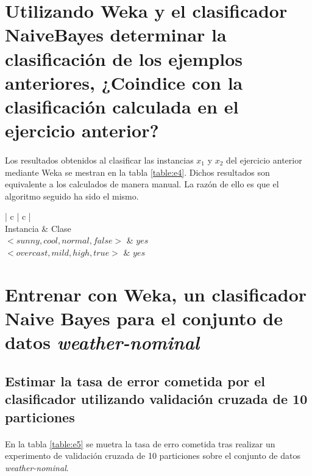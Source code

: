 \documentclass{article}
\begin{document}
	\section{Utilizando Weka y el clasificador NaiveBayes determinar la clasificación de los ejemplos anteriores, ¿Coindice con la clasificación calculada en el ejercicio anterior?}
	\label{sec:e4}

		\paragraph{}
		Los resultados obtenidos al clasificar las instancias $x_1$ y $x_2$ del ejercicio anterior mediante Weka se mestran en la tabla \ref{table:e4}. Dichos resultados son equivalente a los calculados de manera manual. La razón de ello es que el algoritmo seguido ha sido el mismo.

		\begin{table}[H]
			\centering
			\begin{tabu}{ | c | c | }
				\hline
				 \\ \hline
				Instancia	& Clase \\ \hline
				$<sunny, cool, normal, false>$	& $yes$	\\ \hline
				$<overcast, mild, high, true>$	& $yes$	\\
				\hline
			\end{tabu}
			\caption{Clasificación obtenida mediante WEKA}
			\label{table:e4}
		\end{table}

	\section{Entrenar con Weka, un clasificador Naive Bayes para el conjunto de datos \emph{weather-nominal}}
	\label{sec:e5}

		\subsection{Estimar la tasa de error cometida por el clasificador utilizando validación cruzada de 10 particiones}

			\paragraph{}
			En la tabla \ref{table:e5} se muetra la tasa de erro cometida tras realizar un experimento de validación cruzada de 10 particiones sobre el conjunto de datos \emph{weather-nominal}.
\end{document}
